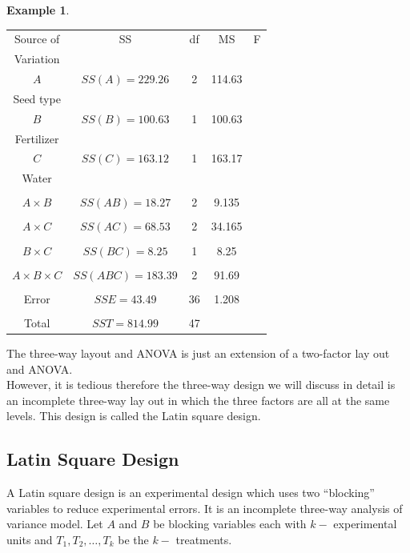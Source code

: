 \documentclass[11pt,a4paper]{article}
\theoremstyle{definition}
\newtheorem{exa}[thm]{Example}
\begin{document}
\begin{exa}
\begin{table}[H]
\centering
\begin{tabular}{|c|c|c|c|c|}
\hline
Source of & SS & df & MS & F\\
Variation &&&&\\
\hline
$A$ & $SS(A)=229.26$ & 2 & 114.63 &  \\
Seed type &&&&\\
\hline
$B$ & $SS(B)=100.63$ & 1 & 100.63 &\\
Fertilizer &&&&\\
\hline
$C$ & $SS(C)=163.12$ & 1 & 163.17&\\
Water &&&&\\
\hline
&&&&\\ 
$A\times B$ & $SS(AB)=18.27$ & 2 & 9.135 & \\
\hline
&&&&\\
$A\times C$ & $SS(AC)=68.53$ & 2 & 34.165 & \\
\hline
&&&&\\
$B\times C$ & $SS(BC) = 8.25$ & 1 & 8.25 & \\
\hline
&&&&\\
$A\times B \times C$ & $SS(ABC) = 183.39$ & 2 & 91.69&\\
\hline
&&&&\\
Error & $SSE=43.49$ & 36 & 1.208 & \\
\hline
&&&&\\
Total & $SST=814.99$ & 47 &&\\
\hline
\end{tabular}
\end{table}




The three-way layout and ANOVA is just an extension of a two-factor lay out and ANOVA.\\ However, it is tedious therefore the three-way design we will discuss in detail is an incomplete three-way lay out in which the three factors are all at the same levels. This design is called the Latin square design.
\end{exa}


\subsection{Latin Square Design}
A Latin square design is an experimental design  which uses two ``blocking'' variables to reduce experimental errors. It is an incomplete three-way analysis of  variance model. Let $A$ and $B$ be blocking variables each with $k-$ experimental units and $T_1,T_2,\ldots ,T_k$ be the $k-$ treatments.
\end{document}
